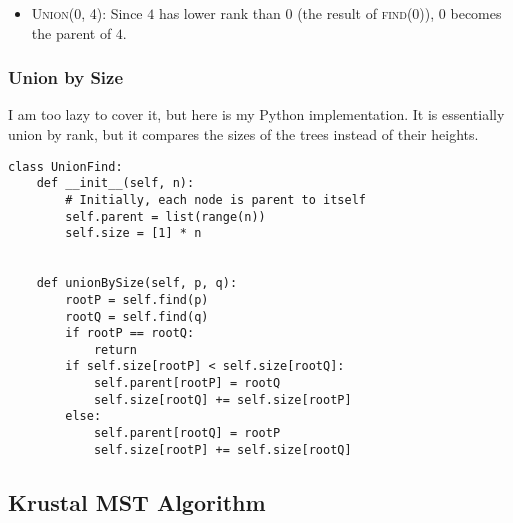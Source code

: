 \begin{itemize}
\begin{center}
    \end{center}
  \item \textsc{Union(0, 4)}: Since $4$ has lower rank than $0$ (the result of \textsc{find(0)}), $0$ becomes the parent of $4$.
    \begin{center}
    \end{center}
\end{itemize}

\subsubsection{Union by Size}

I am too lazy to cover it, but here is my Python implementation.
It is essentially union by rank, but it compares the sizes of the trees instead of their heights.

\begin{verbatim}
class UnionFind:
    def __init__(self, n):
        # Initially, each node is parent to itself
        self.parent = list(range(n))
        self.size = [1] * n


    def unionBySize(self, p, q):
        rootP = self.find(p)
        rootQ = self.find(q)
        if rootP == rootQ:
            return
        if self.size[rootP] < self.size[rootQ]:
            self.parent[rootP] = rootQ
            self.size[rootQ] += self.size[rootP]
        else:
            self.parent[rootQ] = rootP
            self.size[rootP] += self.size[rootQ]
\end{verbatim}

\subsection{Krustal MST Algorithm}

